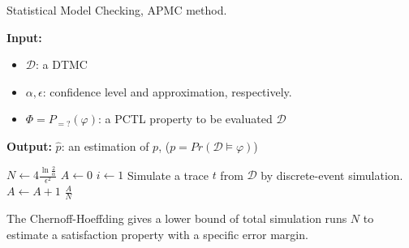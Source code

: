 \begin{algorithm}[H]
      \caption{Statistical Model Checking, APMC method.}
      \label{alg:smc-apmc}
      \footnotesize{
            \hspace*{\algorithmicindent} \textbf{Input:}
            \begin{itemize}[noitemsep,topsep=0pt]
                  \item $\mathcal{D}$: a DTMC
                  \item $\alpha, \epsilon$: confidence level and approximation, respectively.
                  \item $\Phi = P_{=?}(\varphi) $: a PCTL property to be evaluated $\mathcal{D}$
            \end{itemize}
            \hspace*{\algorithmicindent} \textbf{Output:} $\hat{p}$: an estimation of $p$, ($p = Pr(\mathcal{D} \models \varphi)$)
      }
      \begin{algorithmic}[1]
            \State $N \leftarrow 4\frac{\ln{\frac{2}{\alpha}}}{\epsilon^2}$
            \State $A \leftarrow 0$
            \State $i \leftarrow 1$
            \State Simulate a trace $t$ from $\mathcal{D}$ by discrete-event simulation.
            \State $A \leftarrow A + 1$
            \EndIf
            \EndWhile
            \Return $\frac{A}{N}$
            \EndProcedure
      \end{algorithmic}
\end{algorithm}
The Chernoff-Hoeffding gives a lower bound of total simulation runs $N$ to estimate a satisfaction
property with a specific error margin.

